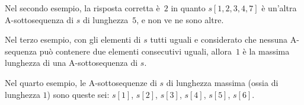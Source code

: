 \documentclass[a4paper,11pt]{article}
\begin{document}
Nel secondo esempio, la risposta corretta è~$2$ in quanto $s[1,2,3,4,7]$ è un'altra A-sottosequenza di $s$ di lunghezza~$5$, e non ve ne sono altre.

Nel terzo esempio, con gli elementi di $s$ tutti uguali e considerato che nessuna A-sequenza può contenere due elementi consecutivi uguali, allora~$1$ è la massima lunghezza di una A-sottosequenza di $s$.

Nel quarto esempio, le A-sottosequenze di $s$ di lunghezza massima (ossia di lunghezza $1$) sono queste sei: $s[1]$, $s[2]$, $s[3]$, $s[4]$, $s[5]$, $s[6]$.
\end{document}
